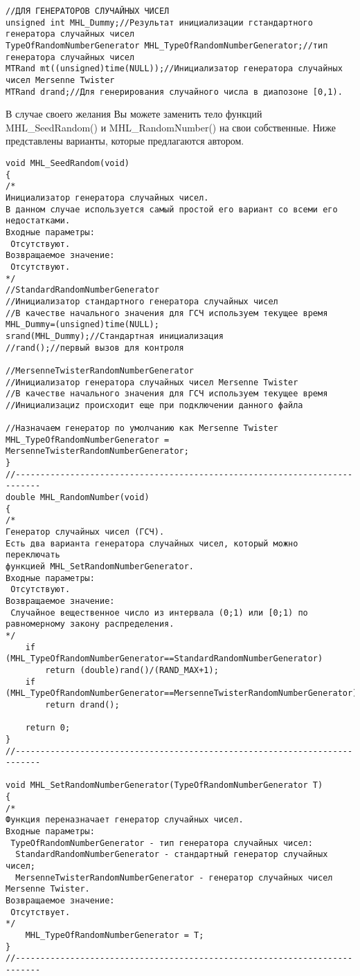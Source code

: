 \documentclass[a4paper,12pt]{article}
\begin{document}
\begin{lstlisting}[label=random_h_cpp,caption=Объявление переменной в HarrixMathLibrary.cpp]
//ДЛЯ ГЕНЕРАТОРОВ СЛУЧАЙНЫХ ЧИСЕЛ
unsigned int MHL_Dummy;//Результат инициализации гстандартного генератора случайных чисел
TypeOfRandomNumberGenerator MHL_TypeOfRandomNumberGenerator;//тип генератора случайных чисел
MTRand mt((unsigned)time(NULL));//Инициализатор генератора случайных чисел Mersenne Twister
MTRand drand;//Для генерирования случайного числа в диапозоне [0,1).
\end{lstlisting}

В случае своего желания Вы можете заменить тело функций MHL\_SeedRandom() и MHL\_RandomNumber() на свои собственные. Ниже представлены варианты, которые предлагаются автором.

\begin{lstlisting}[label=random_standard,caption=Стандартный вариант по умолчанию]
void MHL_SeedRandom(void)
{
/*
Инициализатор генератора случайных чисел.
В данном случае используется самый простой его вариант со всеми его недостатками.
Входные параметры:
 Отсутствуют.
Возвращаемое значение:
 Отсутствуют.
*/
//StandardRandomNumberGenerator
//Инициализатор стандартного генератора случайных чисел
//В качестве начального значения для ГСЧ используем текущее время
MHL_Dummy=(unsigned)time(NULL);
srand(MHL_Dummy);//Стандартная инициализация
//rand();//первый вызов для контроля

//MersenneTwisterRandomNumberGenerator
//Инициализатор генератора случайных чисел Mersenne Twister
//В качестве начального значения для ГСЧ используем текущее время
//Инициализациz происходит еще при подключении данного файла

//Назначаем генератор по умолчанию как Mersenne Twister
MHL_TypeOfRandomNumberGenerator = MersenneTwisterRandomNumberGenerator;
}
//---------------------------------------------------------------------------
double MHL_RandomNumber(void)
{
/*
Генератор случайных чисел (ГСЧ).
Есть два варианта генератора случайных чисел, который можно переключать
функцией MHL_SetRandomNumberGenerator.
Входные параметры:
 Отсутствуют.
Возвращаемое значение:
 Случайное вещественное число из интервала (0;1) или [0;1) по равномерному закону распределения.
*/
    if (MHL_TypeOfRandomNumberGenerator==StandardRandomNumberGenerator)
        return (double)rand()/(RAND_MAX+1);
    if (MHL_TypeOfRandomNumberGenerator==MersenneTwisterRandomNumberGenerator)
        return drand();

    return 0;
}
//---------------------------------------------------------------------------

void MHL_SetRandomNumberGenerator(TypeOfRandomNumberGenerator T)
{
/*
Функция переназначает генератор случайных чисел.
Входные параметры:
 TypeOfRandomNumberGenerator - тип генератора случайных чисел:
  StandardRandomNumberGenerator - стандартный генератор случайных чисел;
  MersenneTwisterRandomNumberGenerator - генератор случайных чисел Mersenne Twister.
Возвращаемое значение:
 Отсутствует.
*/
    MHL_TypeOfRandomNumberGenerator = T;
}
//---------------------------------------------------------------------------
\end{lstlisting}
\end{document}
